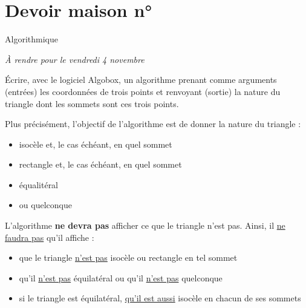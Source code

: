 \cleardoublepage
 



\fancyhead{} %
\fancyfoot{}


\setcounter{ds}{1} %
\setcounter{chaptertemp}{\thechapter} %
\setcounter{chapter}{\theds} %



\section*{Devoir maison n°\theds}\label{DM1}
{\centering \large Algorithmique}

\begin{flushright}
\emph{\`A rendre pour le vendredi 4 novembre}\end{flushright}


\medskip

\'Ecrire, avec le logiciel Algobox, un algorithme prenant comme arguments (entr\'ees) les coordonn\'ees de trois points et renvoyant (sortie) la nature du triangle dont les sommets sont ces trois points.

\medskip

Plus pr\'ecis\'ement, l'objectif de l'algorithme est de donner la nature du triangle :
\begin{itemize}
 \item isoc\`ele et, le cas \'ech\'eant, en quel sommet
 \item rectangle et, le cas \'ech\'eant, en quel sommet
 \item \'equalit\'eral
 \item ou quelconque
\end{itemize}

\medskip

L'algorithme \textbf{ne devra pas} afficher ce que le triangle n'est pas. Ainsi, il \underline{ne faudra pas} qu'il affiche :
\begin{itemize}
 \item que le triangle \underline{n'est pas} isoc\`ele ou rectangle en tel sommet
 \item qu'il \underline{n'est pas} \'equilat\'eral ou  qu'il \underline{n'est pas} quelconque
 \item si le triangle est \'equilat\'eral, \underline{qu'il est aussi} isoc\`ele en chacun de ses sommets
\end{itemize}


